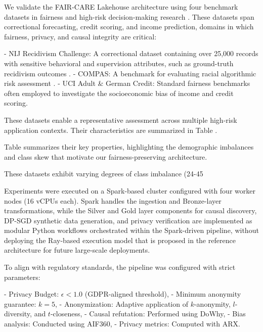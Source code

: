 
We validate the FAIR-CARE Lakehouse architecture using four benchmark datasets in fairness and high-risk decision-making research . These datasets span correctional forecasting, credit scoring, and income prediction, domains in which fairness, privacy, and causal integrity are critical:

- NIJ Recidivism Challenge: A correctional dataset containing over 25{,}000 records with sensitive behavioral and supervision attributes, such as ground-truth recidivism outcomes .
- COMPAS: A benchmark for evaluating racial algorithmic risk assessment .
- UCI Adult \& German Credit: Standard fairness benchmarks often employed to investigate the socioeconomic bias of income and credit scoring.

These datasets enable a representative assessment across multiple high-risk application contexts. Their characteristics are summarized in Table .

Table  summarizes their key properties,
highlighting the demographic imbalances and class skew that motivate our
fairness-preserving architecture.

These datasets exhibit varying degrees of class imbalance (24-45%


Experiments were executed on a Spark-based cluster configured with four worker nodes (16 vCPUs each). Spark handles the ingestion and Bronze-layer transformations, while the Silver and Gold layer components for causal discovery, DP-SGD synthetic data generation, and privacy verification are implemented as modular Python workflows orchestrated within the Spark-driven pipeline, without deploying the Ray-based execution model that is proposed in the reference architecture for future large-scale deployments.

To align with regulatory standards, the pipeline was configured with strict parameters:

- Privacy Budget: $\epsilon < 1.0$ (GDPR-aligned threshold),
- Minimum anonymity guarantee: $k=5$,
- Anonymization: Adaptive application of $k$-anonymity, $l$-diversity, and $t$-closeness,
- Causal refutation: Performed using DoWhy,
- Bias analysis: Conducted using AIF360,
- Privacy metrics: Computed with ARX.

